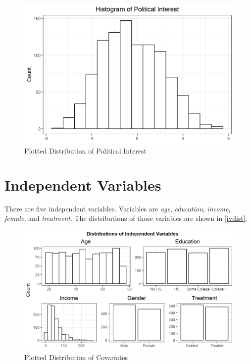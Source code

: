 \documentclass[letterpaper, 12pt]{article}
\begin{document}
    \begin{figure}[h!] %
        \centering
          \includegraphics[width=6in]{dvdist.png}
          \caption{Plotted Distribution of Political Interest} %
          \label{dvdist} %
    \end{figure}

    \section{Independent Variables}

    \par There are five independent variables. Variables are \textit{age}, \textit{education}, \textit{income}, \textit{female}, and \textit{treatment}. The distributions of those variables are shown in \autoref{ivdist}.

    \begin{figure}[h!] %
        \centering
          \includegraphics[width=6in]{ivdist.png}
          \caption{Plotted Distribution of Covariates} %
          \label{ivdist} %
    \end{figure}
\end{document}
